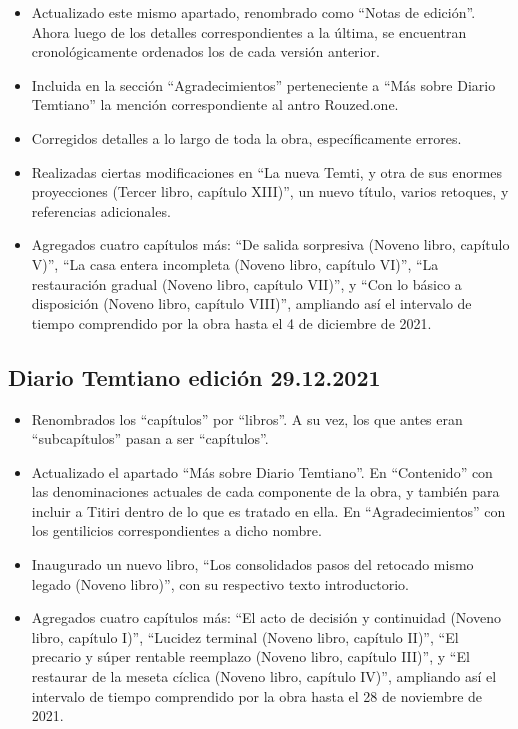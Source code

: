 \documentclass[
]{book}
\begin{document}
\begin{itemize}
\item
  Actualizado este mismo apartado, renombrado como ``Notas de edición''. Ahora luego de los detalles correspondientes a la última, se encuentran cronológicamente ordenados los de cada versión anterior.
\item
  Incluida en la sección ``Agradecimientos'' perteneciente a ``Más sobre Diario Temtiano'' la mención correspondiente al antro Rouzed.one.
\item
  Corregidos detalles a lo largo de toda la obra, específicamente errores.
\item
  Realizadas ciertas modificaciones en ``La nueva Temti, y otra de sus enormes proyecciones (Tercer libro, capítulo XIII)'', un nuevo título, varios retoques, y referencias adicionales.
\item
  Agregados cuatro capítulos más: ``De salida sorpresiva (Noveno libro, capítulo V)'', ``La casa entera incompleta (Noveno libro, capítulo VI)'', ``La restauración gradual (Noveno libro, capítulo VII)'', y ``Con lo básico a disposición (Noveno libro, capítulo VIII)'', ampliando así el intervalo de tiempo comprendido por la obra hasta el 4 de diciembre de 2021.
\end{itemize}

\hypertarget{diario-temtiano-ediciuxf3n-29.12.2021}{%
\subsection*{Diario Temtiano edición 29.12.2021}\label{diario-temtiano-ediciuxf3n-29.12.2021}}

\begin{itemize}
\item
  Renombrados los ``capítulos'' por ``libros''. A su vez, los que antes eran ``subcapítulos'' pasan a ser ``capítulos''.
\item
  Actualizado el apartado ``Más sobre Diario Temtiano''. En ``Contenido'' con las denominaciones actuales de cada componente de la obra, y también para incluir a Titiri dentro de lo que es tratado en ella. En ``Agradecimientos'' con los gentilicios correspondientes a dicho nombre.
\item
  Inaugurado un nuevo libro, ``Los consolidados pasos del retocado mismo legado (Noveno libro)'', con su respectivo texto introductorio.
\item
  Agregados cuatro capítulos más: ``El acto de decisión y continuidad (Noveno libro, capítulo I)'', ``Lucidez terminal (Noveno libro, capítulo II)'', ``El precario y súper rentable reemplazo (Noveno libro, capítulo III)'', y ``El restaurar de la meseta cíclica (Noveno libro, capítulo IV)'', ampliando así el intervalo de tiempo comprendido por la obra hasta el 28 de noviembre de 2021.
\end{itemize}
\end{document}
